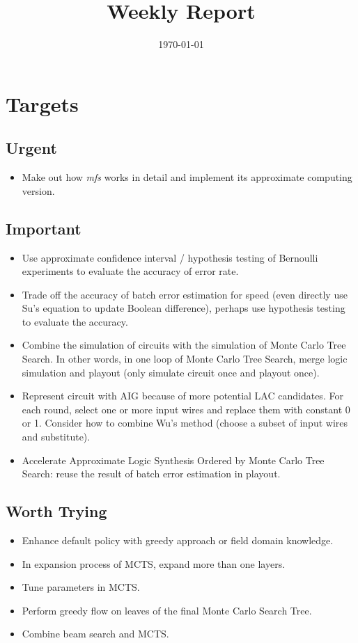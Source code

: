 \documentclass{article}
\title{Weekly Report}
\author{}
\date{\today}
\begin{document}
\maketitle

\section{Targets}

\subsection{Urgent}
\begin{itemize}
    \item Make out how \textit{mfs} works in detail and implement its approximate computing version.
\end{itemize}

\subsection{Important}
\begin{itemize}
    \item Use approximate confidence interval / hypothesis testing of Bernoulli experiments to evaluate the accuracy of error rate.
    \item Trade off the accuracy of batch error estimation for speed
        (even directly use Su's equation to update Boolean difference),
        perhaps use hypothesis testing to evaluate the accuracy.
    \item Combine the simulation of circuits with the simulation of Monte Carlo Tree Search.
        In other words,
        in one loop of Monte Carlo Tree Search,
        merge logic simulation and playout (only simulate circuit once and playout once).
    \item Represent circuit with AIG because of more potential LAC candidates.
        For each round, select one or more input wires and replace them with constant 0 or 1.
        Consider how to combine Wu's method (choose a subset of input wires and substitute).
    \item Accelerate Approximate Logic Synthesis Ordered by Monte Carlo Tree Search:
        reuse the result of batch error estimation in playout.
\end{itemize}

\subsection{Worth Trying}
\begin{itemize}
    \item Enhance default policy with greedy approach or field domain knowledge.
    \item In expansion process of MCTS, expand more than one layers.
    \item Tune parameters in MCTS\@.
    \item Perform greedy flow on leaves of the final Monte Carlo Search Tree.
    \item Combine beam search and MCTS\@.
\end{itemize}
\end{document}
